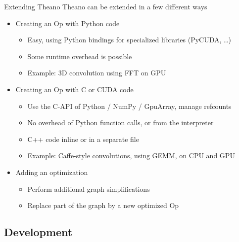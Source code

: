 \documentclass[a4paper,9pt]{beamer}
\begin{document}
\begin{frame}{Extending Theano}
Theano can be extended in a few different ways
  \begin{itemize}
    \item Creating an Op with Python code
      \begin{itemize}
        \item Easy, using Python bindings for specialized libraries (PyCUDA, \ldots)
        \item Some runtime overhead is possible
        \item Example: 3D convolution using FFT on GPU
      \end{itemize}
    \item Creating an Op with C or CUDA code
      \begin{itemize}
        \item Use the C-API of Python / NumPy / GpuArray, manage refcounts
        \item No overhead of Python function calls, or from the interpreter
        \item C++ code inline or in a separate file
        \item Example: Caffe-style convolutions, using GEMM, on CPU and GPU
      \end{itemize}
    \item Adding an optimization
      \begin{itemize}
        \item Perform additional graph simplifications
        \item Replace part of the graph by a new optimized Op
      \end{itemize}
  \end{itemize}
\end{frame}


\subsection{Development}
\end{document}
